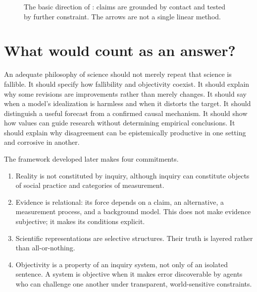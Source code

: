\begin{figure}[ht]
\centering
{}
\caption{The basic direction of \RCR: claims are grounded by contact and
tested by further constraint. The arrows are not a single linear method.}
\label{fig:rcr-cycle}
\end{figure}

\section{What would count as an answer?}

An adequate philosophy of science should not merely repeat that science is
fallible. It should specify how fallibility and objectivity coexist. It should
explain why some revisions are improvements rather than merely changes. It
should say when a model's idealization is harmless and when it distorts the
target. It should distinguish a useful forecast from a confirmed causal
mechanism. It should show how values can guide research without determining
empirical conclusions. It should explain why disagreement can be epistemically
productive in one setting and corrosive in another.

The framework developed later makes four commitments.

\begin{enumerate}
\item Reality is not constituted by inquiry, although inquiry can constitute
objects of social practice and categories of measurement.
\item Evidence is relational: its force depends on a claim, an alternative, a
measurement process, and a background model. This does not make evidence
subjective; it makes its conditions explicit.
\item Scientific representations are selective structures. Their truth is
layered rather than all-or-nothing.
\item Objectivity is a property of an inquiry system, not only of an isolated
sentence. A system is objective when it makes error discoverable by agents who
can challenge one another under transparent, world-sensitive constraints.
\end{enumerate}


